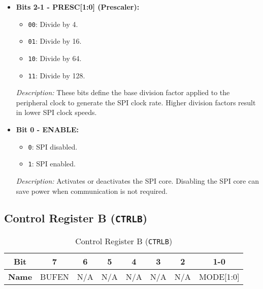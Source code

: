 \begin{itemize}
      \item \textbf{Bits 2-1 - PRESC[1:0] (Prescaler):} 
      \begin{itemize}
          \item \texttt{00}: Divide by 4.
          \item \texttt{01}: Divide by 16.
          \item \texttt{10}: Divide by 64.
          \item \texttt{11}: Divide by 128.
      \end{itemize}
      \textit{Description:} These bits define the base division factor applied to the peripheral clock to generate the SPI clock rate. Higher division factors result in lower SPI clock speeds.
      
      \item \textbf{Bit 0 - ENABLE:} 
      \begin{itemize}
          \item \texttt{0}: SPI disabled.
          \item \texttt{1}: SPI enabled.
      \end{itemize}
      \textit{Description:} Activates or deactivates the SPI core. Disabling the SPI core can save power when communication is not required.
  \end{itemize}
  
  \subsection{Control Register B (\texttt{CTRLB})}
  \label{sec:ctrlb}
  
  \begin{table}[H]
      \centering
      \caption{Control Register B (\texttt{CTRLB})}
      \begin{tabular}{@{}cccccccc@{}}
          \toprule
          \textbf{Bit} & 7 & 6 & 5 & 4 & 3 & 2 & 1-0 \\ \midrule
          \textbf{Name} & BUFEN & N/A & N/A & N/A & N/A & N/A & MODE[1:0] \\ \bottomrule
      \end{tabular}
      \label{tab:ctrl_b}
  \end{table}
  
